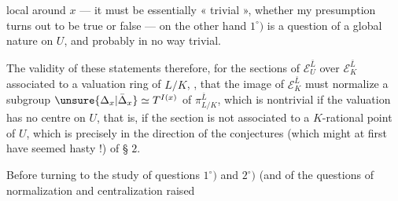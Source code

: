 local around $x$ --- it must be essentially « trivial », whether my presumption turns out to be true or false --- on the other hand $1^\circ)$ is a question of a global nature on $U$, and probably in  no way trivial.

 The validity of these statements   therefore, for the sections of $\mathcal E_U^{\bar L}$ over $\mathcal E_K^{\bar L}$ associated to a valuation ring of $L/K$, , that the image of $\mathcal E_K^{\bar L}$ must normalize a  subgroup $\unsure{\Delta_x|\bar\Delta_x}\simeq T^{I(x)}$ of $\pi_{L/K}^{\bar L}$, which is nontrivial if the valuation has no centre on $U$, that is, if the section is not associated to a $K$-rational point of $U$, which is precisely in the direction of the conjectures (which might at first have seemed hasty !) of § $2$.

Before turning to the study of questions $1^\circ)$ and $2^\circ)$ (and  of the questions of normalization and centralization raised
